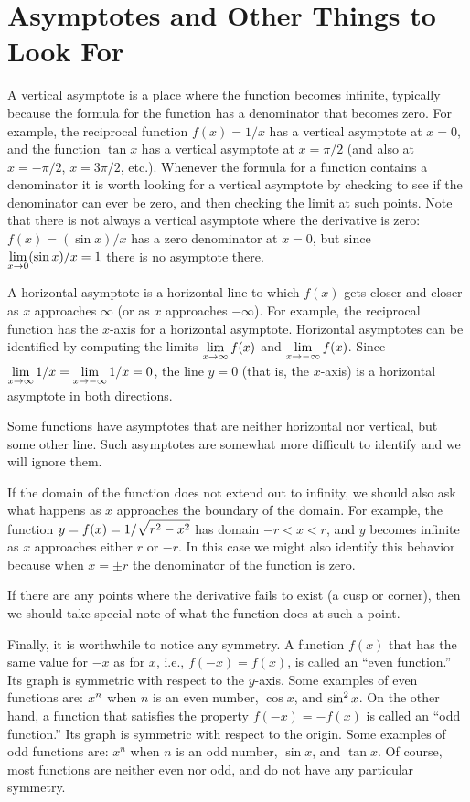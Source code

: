 \section{Asymptotes and Other Things to Look For}  {}{}
\nobreak
A vertical asymptote is a place where the function
becomes infinite, typically because the formula for the function has a
denominator that becomes zero.  For example, the reciprocal function
$f(x)=1/x$ has a vertical asymptote at $x=0$, and the function $\tan
x$ has a vertical asymptote at $x=\pi/2$ (and also at $x=-\pi/2$,
$x=3\pi/2$, etc.).  Whenever the formula for a function contains a
denominator it is worth looking for a vertical asymptote by 
checking to see if the denominator can ever be zero, and then checking
the limit at such points. Note that there is not always a vertical
asymptote where the derivative is zero: $f(x)=(\sin x)/x$ has a zero
denominator at $x=0$, but since $\displaystyle \lim_{x\to 0}(\sin x)/x=1$ there is
no asymptote there.

A horizontal asymptote is a horizontal line to which $f(x)$ gets closer and
closer as $x$ approaches $\infty$ (or as $x$ approaches $-\infty$).  For
example, the reciprocal function has the $x$-axis for a horizontal
asymptote.  Horizontal asymptotes can be identified by computing 
the limits $\displaystyle \lim_{x \to \infty}f(x)$ and $\displaystyle \lim_{x \to -\infty}f(x)$.
Since $\displaystyle \lim_{x \to \infty}1/x=\lim_{x \to -\infty}1/x=0$, the line
$y=0$ (that is, the $x$-axis) is a horizontal asymptote in both directions.

Some functions have asymptotes that are neither horizontal nor
vertical, but some other line. Such asymptotes are somewhat more
difficult to identify and we will ignore them.

If the domain of the function does not extend out to infinity, we should
also ask what happens as $x$ approaches the boundary of the domain.  For
example, the function $\displaystyle y=f(x)=1/\sqrt{r^2-x^2}$ has domain $-r<x<r$, and
$y$ becomes infinite as $x$ approaches either $r$ or $-r$. In this
case we might also identify this behavior because when $x=\pm r$ the
denominator of the function is zero.

If there are any points where the derivative fails to exist (a cusp or
corner), then we should take special note of what the function does at such
a point.

Finally, it is worthwhile to notice any symmetry.  A function $f(x)$ that
has the same value for $-x$ as for $x$, i.e., $f(-x)=f(x)$, is called an
``even function.''  Its graph is symmetric with respect to the $y$-axis.
Some examples of even functions are: $\displaystyle x^n$ when $n$ is an even number,
$\cos x$, and $\displaystyle \sin^2x$.  On the other hand, a function that satisfies the
property $f(-x)=-f(x)$ is called an ``odd function.''  Its graph is
symmetric with respect to the origin.  Some examples of odd functions are:
$x^n$ when $n$ is an odd number, $\sin x$, and $\tan x$.  Of course, most
functions are neither even nor odd, and do not have any particular
symmetry.
 
